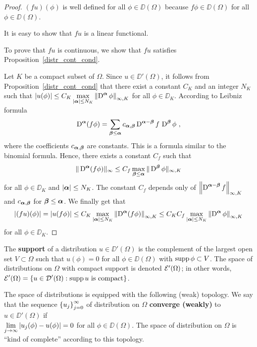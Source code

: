 \begin{proof}
 $(f u)(\phi)$ is well defined for all $\phi \in \DD(\Omega)$
because $f \phi \in \DD(\Omega)$ for all $\phi\in \DD(\Omega)$.

 It is easy to show that $f u$ is a linear functional.

 To prove that $f u$ is continuous, we show that $f u$
satisfies Proposition~\ref{distr_cont_cond}.

Let $K$ be a compact subset of $\Omega$.  Since $u\in \DD'(\Omega)$,
it follows from Proposition~\ref{distr_cont_cond} that there exist a
constant $C_K$ and an integer $N_K$ such that
$\displaystyle \left| u(\phi) \right| \leq C_K \max_{|{\bm{\alpha}}|\leq N_K}
\left\| \operatorname{D}^{{\bm{\alpha}}} \phi \right\|_{\infty,K}$ for all
$\phi \in \DD_K$.  According to Leibniz formula
\[
\diff^{\VEC{\alpha}} (f \phi) = \sum_{\VEC{\beta} \leq \VEC{\alpha}}
c_{\VEC{\alpha},\VEC{\beta}}
\diff^{\VEC{\alpha}-\VEC{\beta}}f \,\diff^{\VEC{\beta}} \phi \ ,
\]
where the coefficients $c_{{\bm{\alpha}},{\bm{\beta}}}$ are constants.
This is a formula similar to the binomial formula.  Hence, there
exists a constant $C_f$ such that
\[
\| \operatorname{D}^{{\bm{\alpha}}} (f \phi) \|_{\infty} \leq C_f
\max_{{\bm{\beta}}\leq{\bm{\alpha}}} \|\operatorname{D}^{{\bm{\beta}}} \phi\|_{\infty,K}
\]
for all $\phi \in \DD_K$ and $|{\bm{\alpha}}|\leq N_K$.  The constant $C_f$
depends only of
$\displaystyle \left\|\operatorname{D}^{{\bm{\alpha}}-{\bm{\beta}}} f\right\|_{\infty,K}$
and $c_{{\bm{\alpha}},{\bm{\beta}}}$ for ${\bm{\beta}} \leq {\bm{\alpha}}$.
We finally get that
\[
\left| (f u)(\phi) \right| =
\left| u(f \phi) \right| \leq C_K \max_{|{\bm{\alpha}}|\leq N_K}
\left\| \operatorname{D}^{{\bm{\alpha}}} (f \phi) \right\|_{\infty,K}
\leq C_K C_f \max_{|{\bm{\alpha}}|\leq N_K}
\left\| \operatorname{D}^{{\bm{\alpha}}} \phi \right\|_{\infty,K}
\]
for all $\phi \in \DD_K$.
\end{proof}

The {\bfseries support} of a distribution
$u\in \DD'(\Omega)$ is the complement of the largest open set
$V\subset \Omega$ such that $u(\phi)=0$ for all $\phi \in \DD(\Omega)$ with
$\operatorname{supp} \phi \subset V$.  The space of distributions on $\Omega$
with compact support is denoted $\mathcal{E}'(\Omega)$; in other words,
$\displaystyle \mathcal{E}'(\Omega) = \left\{ u \in \mathcal{D}'(\Omega) : \operatorname{supp} u
\text{ is compact} \right\}$.

The space of distributions is equipped with the following (weak) topology.
We say that the sequence
$\displaystyle \left\{ u_j\right\}_{j=0}^\infty$ of distribution on
$\Omega$ {\bfseries converge (weakly)} to
$u\in \DD'(\Omega)$ if \\
$\displaystyle \lim_{j\rightarrow \infty} \left|u_j(\phi) - u(\phi) \right| = 0$
for all $\phi \in \DD(\Omega)$.  The space of distribution on $\Omega$
is ``kind of complete'' according to this topology.

